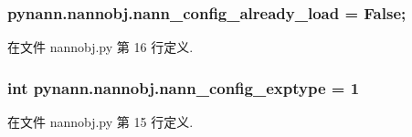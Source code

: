 \hypertarget{namespacepynann_1_1nannobj_a0db70474ff951be8c8dd2490ce99b79a}{}
\subsubsection[{nann\+\_\+config\+\_\+already\+\_\+load}]{\setlength{\rightskip}{0pt plus 5cm}pynann.\+nannobj.\+nann\+\_\+config\+\_\+already\+\_\+load = False;}\label{namespacepynann_1_1nannobj_a0db70474ff951be8c8dd2490ce99b79a}


在文件 nannobj.\+py 第 16 行定义.

\hypertarget{namespacepynann_1_1nannobj_a6a25a8097eab0c8ec490eb5f9b4674c9}{}
\subsubsection[{nann\+\_\+config\+\_\+exptype}]{\setlength{\rightskip}{0pt plus 5cm}int pynann.\+nannobj.\+nann\+\_\+config\+\_\+exptype = 1}\label{namespacepynann_1_1nannobj_a6a25a8097eab0c8ec490eb5f9b4674c9}


在文件 nannobj.\+py 第 15 行定义.

